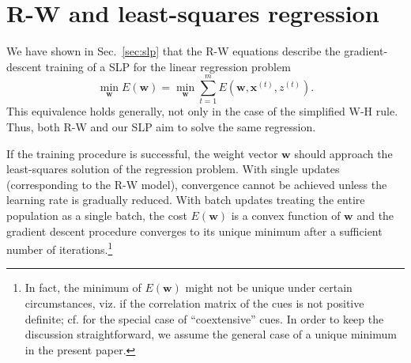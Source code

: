 \documentclass[a4paper,11pt]{article} %
\newcommand{\psup}[1]{\ensuremath{^{(#1)}}}
\newcommand{\psupt}{\psup{t}}
\begin{document}
\section{R-W and least-squares regression}
\label{sec:regression}

We have shown in Sec.~\ref{sec:slp} that the R-W equations describe the gradient-descent training of a SLP for the linear regression problem
\begin{equation}
  \label{eq:lsr-def}
  \min_{\mathbf{w}} E(\mathbf{w})
  = \min_{\mathbf{w}} \sum_{t=1}^m E(\mathbf{w}, \mathbf{x}\psupt, z\psupt) .
\end{equation}
This equivalence holds generally, not only in the case of the simplified W-H rule.  Thus, both R-W and our SLP aim to solve the same regression.

If the training procedure is successful, the weight vector $\mathbf{w}$ should approach the least-squares solution of the regression problem.  With single updates (corresponding to the R-W model), convergence cannot be achieved unless the learning rate is gradually reduced.  With batch updates treating the entire population as a single batch, the cost $E(\mathbf{w})$ is a convex function of $\mathbf{w}$ and the gradient descent procedure converges to its unique minimum after a sufficient number of iterations.\footnote{In fact, the minimum of $E(\mathbf{w})$ might not be unique under certain circumstances, viz. if the correlation matrix of the cues is not positive definite; cf. \citet[115--116]{danks2003} for the special case of ``coextensive'' cues. In order to keep the discussion straightforward, we assume the general case of a unique minimum in the present paper.}
\end{document}
